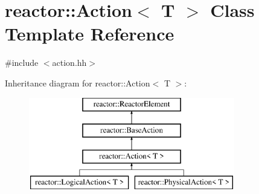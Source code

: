 \hypertarget{classreactor_1_1Action}{}\section{reactor\+:\+:Action$<$ T $>$ Class Template Reference}
\label{classreactor_1_1Action}


{\ttfamily \#include $<$action.\+hh$>$}

Inheritance diagram for reactor\+:\+:Action$<$ T $>$\+:\begin{figure}[H]
\begin{center}
\leavevmode
\includegraphics[height=4.000000cm]{classreactor_1_1Action}
\end{center}
\end{figure}
